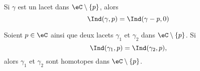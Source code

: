 \begin{lemma}    \label{LEMooCTIBooNRAyZH}
    Si \( \gamma\) est un lacet dans \( \eC\setminus\{ p \}\), alors
    \begin{equation}
        \Ind(\gamma,p)=\Ind(\gamma-p,0)
    \end{equation}
\end{lemma}

\begin{proposition}       \label{PROPooPRIIooKWCHBZ}
    Soient \( p\in \eC\) ainsi que deux lacets \( \gamma_1\) et \( \gamma_2\) dans \( \eC\setminus\{ p \}\). Si
    \begin{equation}
        \Ind(\gamma_1,p)=\Ind(\gamma_2,p),
    \end{equation}
    alors \( \gamma_1\) et \( \gamma_2\) sont homotopes dans \( \eC\setminus \{ p \}\).
\end{proposition}

